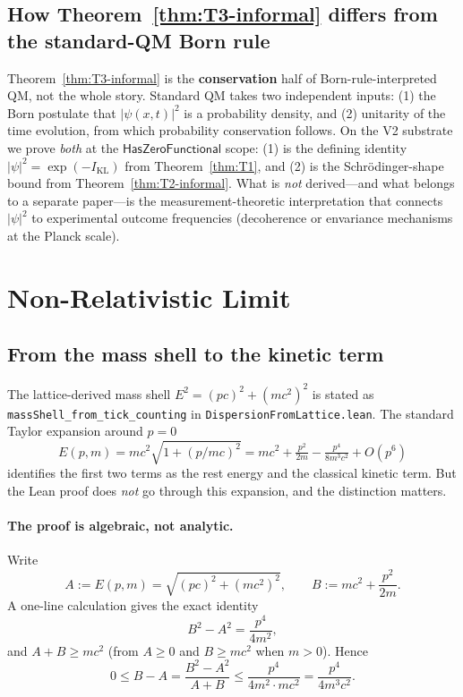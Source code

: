 \documentclass[11pt,a4paper,twoside]{article}
\theoremstyle{definition}
\newcommand{\KL}{I_{\mathrm{KL}}}
\newcommand{\HasZF}{\mathsf{HasZeroFunctional}}
\newcommand{\code}[1]{\texttt{#1}}
\begin{document}
\subsection{How Theorem~\ref{thm:T3-informal} differs from the
standard-QM Born rule}\label{sec:born-vs-standard}

Theorem~\ref{thm:T3-informal} is the \textbf{conservation} half of
Born-rule-interpreted QM, not the whole story. Standard QM takes two
independent inputs: (1) the Born postulate that $|\psi(x,t)|^{2}$ is a
probability density, and (2) unitarity of the time evolution, from
which probability conservation follows. On the V2 substrate we prove
\emph{both} at the $\HasZF$ scope: (1) is the defining identity
$|\psi|^{2}=\exp(-\KL)$ from Theorem~\ref{thm:T1}, and (2) is the
Schr\"odinger-shape bound from Theorem~\ref{thm:T2-informal}. What is
\emph{not} derived---and what belongs to a separate paper---is the
measurement-theoretic interpretation that connects $|\psi|^{2}$ to
experimental outcome frequencies (decoherence or envariance
mechanisms at the Planck scale).

\section{Non-Relativistic Limit}\label{sec:nonrel}

\subsection{From the mass shell to the kinetic term}\label{sec:nonrel-alg}

The lattice-derived mass shell $E^{2}=(pc)^{2}+(mc^{2})^{2}$ is stated
as \code{massShell\_from\_tick\_counting} in
\code{DispersionFromLattice.lean}. The standard Taylor expansion
around $p=0$
\[
E(p,m)=mc^{2}\sqrt{1+(p/mc)^{2}}
      =mc^{2}+\tfrac{p^{2}}{2m}-\tfrac{p^{4}}{8m^{3}c^{2}}+O(p^{6})
\]
identifies the first two terms as the rest energy and the classical
kinetic term. But the Lean proof does \emph{not} go through this
expansion, and the distinction matters.

\paragraph{The proof is algebraic, not analytic.}
Write
\[
A:=E(p,m)=\sqrt{(pc)^{2}+(mc^{2})^{2}},\qquad
B:=mc^{2}+\frac{p^{2}}{2m}.
\]
A one-line calculation gives the exact identity
\[
B^{2}-A^{2}=\frac{p^{4}}{4m^{2}},
\]
and $A+B\ge mc^{2}$ (from $A\ge 0$ and $B\ge mc^{2}$ when $m>0$).
Hence
\[
0\le B-A=\frac{B^{2}-A^{2}}{A+B}\le\frac{p^{4}}{4m^{2}\cdot mc^{2}}=\frac{p^{4}}{4m^{3}c^{2}}.
\]
\end{document}
